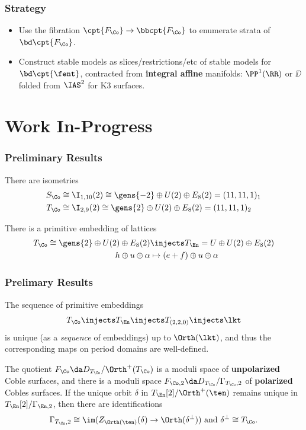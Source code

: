 \documentclass{beamer}
\begin{document}
{%
\begin{frame}\frametitle{Strategy}
{\small
\begin{itemize}
\item Use the fibration $\cpt{F_{\Co}} \to \bbcpt{F_{\Co}}$ to enumerate strata of $\bd \cpt{F_{\Co}}$.
\item Construct stable models as slices/restrictions/etc of stable models for $\bd \cpt{\fent}$, contracted from \textbf{integral affine} manifolds: $\PP^1(\RR)$ or $\DD$ folded from $\IAS^2$ for K3 surfaces.
\end{itemize}
}
\end{frame}
\section{Work In-Progress}
\begin{frame}\frametitle{Preliminary Results}
\begin{theorem}
There are isometries
\begin{align*}
S_{\Co} &\cong \I_{1, 10}(2) \cong \gens{-2} \oplus U(2) \oplus E_8(2) = (11,11,1)_1 \\
T_{\Co} &\cong \I_{2, 9}(2) \cong \gens{2} \oplus U(2) \oplus E_8(2) = (11,11,1)_2
\end{align*}
\end{theorem}
\begin{theorem}
There is a primitive embedding of lattices
\begin{align*}
T_{\Co} \cong \gens{2} \oplus U(2) \oplus E_8(2) &\injects T_{\En} = U \oplus U(2) \oplus E_8(2) \\
h \oplus u \oplus \alpha &\mapsto (e+f) \oplus u \oplus \alpha
\end{align*}
\end{theorem}
\end{frame}
\begin{frame}\frametitle{Prelimary Results}
{\small
\begin{theorem}
The sequence of primitive embeddings
\begin{align*}
T_{\Co} \injects T_{\En} \injects T_{(2,2,0)} \injects \lkt
\end{align*}
is unique (as a \textit{sequence} of embeddings) up to $\Orth(\lkt)$, and thus the corresponding maps on period domains are well-defined.
\end{theorem}
\begin{theorem}
The quotient $F_{\Co} \da D_{T_\Co} / \Orth^+(T_\Co)$ is a moduli space of \textbf{unpolarized} Coble surfaces, and there is a moduli space $F_{\Co, 2} \da D_{T_{\Co}}/\Gamma_{T_{\Co}, 2}$ of \textbf{polarized} Cobles surfaces.
If the unique orbit $\delta$ in $T_{\En}[2]/\Orth^+(\ten)$ remains unique in $T_{\En}[2]/\Gamma_{\En, 2}$, then there are identifications
\[
\Gamma_{T_{\Co}, 2} \cong \im( Z_{\Orth(\ten)} (\delta) \to \Orth(\delta^\perp) ) \text{ and } \delta^\perp \cong T_{\Co}
.\]
\end{theorem}
}


\end{frame}}
\end{document}

